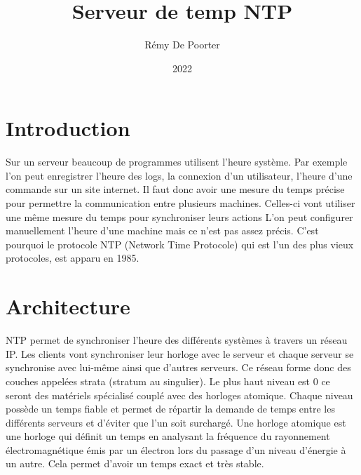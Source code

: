 \documentclass[a4paper]{article}
\begin{document}
\begin{adjustwidth}{-2cm}{-2cm}
\title{Serveur de temp NTP}
\author{Rémy De Poorter}
\date{2022}
\maketitle
\newpage

\tableofcontents
\newpage

\section{Introduction}
Sur un serveur beaucoup de programmes utilisent l’heure système. Par exemple l'on peut enregistrer l’heure des logs, la connexion d’un utilisateur, l’heure d’une commande sur un site internet. Il faut donc avoir une mesure du temps précise pour permettre la communication entre plusieurs machines. Celles-ci vont utiliser une même mesure du temps pour synchroniser leurs actions
\newline
\newline
L’on peut configurer manuellement l’heure d’une machine mais ce n’est pas assez précis. C’est pourquoi le protocole NTP (Network Time Protocole) qui est l’un des plus vieux protocoles, est apparu en 1985.

 \newpage
\section{Architecture}
NTP permet de synchroniser l’heure des différents systèmes à travers un réseau IP. Les clients vont synchroniser leur horloge avec le serveur et chaque serveur se synchronise avec lui-même ainsi que d’autres serveurs. Ce réseau forme donc des couches appelées strata (stratum au singulier). Le plus haut niveau est 0 ce seront des matériels spécialisé couplé avec des horloges atomique. Chaque niveau possède un temps fiable et permet de répartir la demande de temps entre les différents serveurs et d’éviter que l’un soit surchargé.
\newline
\newline
Une horloge atomique est une horloge qui définit un temps en analysant la fréquence du rayonnement électromagnétique émis par un électron lors du passage d’un niveau d’énergie à un autre. Cela permet d’avoir un temps exact et très stable.


\end{adjustwidth}
\end{document}
